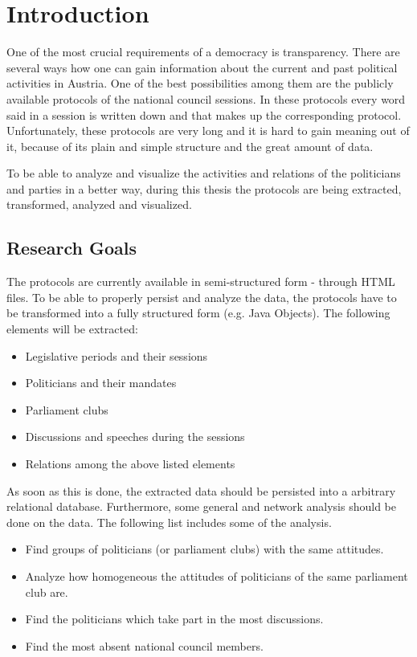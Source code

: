 \chapter{Introduction}
\label{sec:introduction}

One of the most crucial requirements of a democracy is transparency. There are several ways how one can gain information about the current and past political activities in Austria. One of the best possibilities among them are the publicly available protocols of the national council sessions. In these protocols every word said in a session is written down and that makes up the corresponding protocol. Unfortunately, these protocols are very long and it is hard to gain meaning out of it, because of its plain and simple structure and the great amount of data.

To be able to analyze and visualize the activities and relations of the politicians and parties in a better way, during this thesis the protocols are being extracted, transformed, analyzed and visualized.

\section{Research Goals}
The protocols are currently available in semi-structured form - through HTML files. To be able to properly persist and analyze the data, the protocols have to be transformed into a fully structured form (e.g. Java Objects). The following elements will be extracted:
\begin{itemize}
  \item Legislative periods and their sessions
  \item Politicians and their mandates
  \item Parliament clubs
  \item Discussions and speeches during the sessions
  \item Relations among the above listed elements
\end{itemize}

As soon as this is done, the extracted data should be persisted into a arbitrary relational database. Furthermore, some general and network analysis should be done on the data. The following list includes some of the analysis.
\begin{itemize}
  \item Find groups of politicians (or parliament clubs) with the same attitudes.
  \item Analyze how homogeneous the attitudes of politicians of the same parliament club are.
  \item Find the politicians which take part in the most discussions.
  \item Find the most absent national council members.
\end{itemize}


